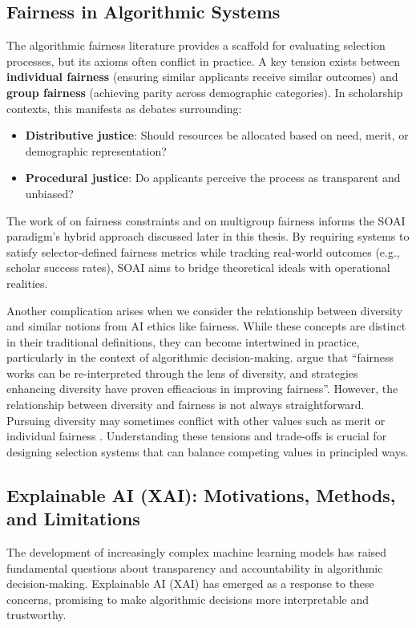 \subsection{Fairness in Algorithmic Systems}\label{ssec:context_fairness}
The algorithmic fairness literature provides a scaffold for evaluating selection processes, but its axioms often conflict in practice. A key tension exists between \textbf{individual fairness} (ensuring similar applicants receive similar outcomes) and \textbf{group fairness} (achieving parity across demographic categories). In scholarship contexts, this manifests as debates surrounding:
\begin{itemize}
    \item \textbf{Distributive justice}: Should resources be allocated based on need, merit, or demographic representation?
    \item \textbf{Procedural justice}: Do applicants perceive the process as transparent and unbiased?
\end{itemize}
The work of \textcite{dwork_fairness_2012} on fairness constraints and \textcite{pmlr-v80-kearns18a} on multigroup fairness informs the SOAI paradigm's hybrid approach discussed later in this thesis. By requiring systems to satisfy selector-defined fairness metrics while tracking real-world outcomes (e.g., scholar success rates), SOAI aims to bridge theoretical ideals with operational realities.

Another complication arises when we consider the relationship between diversity and similar notions from AI ethics like fairness. While these concepts are distinct in their traditional definitions, they can become intertwined in practice, particularly in the context of algorithmic decision-making. \textcite{zhao2023fairness} argue that ``fairness works can be re-interpreted through the lens of diversity, and strategies enhancing diversity have proven efficacious in improving fairness''. However, the relationship between diversity and fairness is not always straightforward. Pursuing diversity may sometimes conflict with other values such as merit or individual fairness \cite{dwork_fairness_2012}. Understanding these tensions and trade-offs is crucial for designing selection systems that can balance competing values in principled ways.

\subsection{Explainable AI (XAI): Motivations, Methods, and Limitations}\label{ssec:context_xai}
The development of increasingly complex machine learning models has raised fundamental questions about transparency and accountability in algorithmic decision-making. Explainable AI (XAI) has emerged as a response to these concerns, promising to make algorithmic decisions more interpretable and trustworthy.

